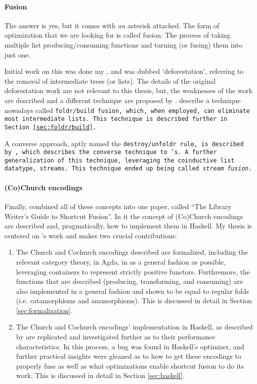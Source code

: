 \paragraph{Fusion}
The answer is yes{\Large*}, but it comes with \textit{an} asterisk attached.
The form of optimization that we are looking for is called fusion:
The process of taking multiple list producing/consuming functions and turning (or fusing) them into just one.

Initial work on this was done my \cite{Wadler1984,Wadler1986,Wadler1990}, and was dubbed `deforestation', referring to the removal of intermediate trees (or lists).
The details of the original deforestation work are not relevant to this thesis, but, the weaknesses of the work are described and a different technique are proposed by \cite{Gill1993}.
\cite{Gill1993} describe a technique nowadays called \tt{foldr/build} fusion, which, when employed, can eliminate most intermediate lists.
This technique is described further in Section \ref{sec:foldr/build}.

A converse approach, aptly named the \tt{destroy/unfoldr} rule, is described by \cite{Svenningsson2002}, which describes the converse technique to \cite{Gill1993}'s.
A further generalization of this technique, leveraging the coinductive list datatype, streams. This technique ended up being called \textit{stream fusion}.

\paragraph{(Co)Church encodings}
Finally, \cite{Harper2011} combined all of these concepts into one paper, called ``The Library Writer's Guide to Shortcut Fusion''. In it the concept of (Co)Church encodings are described and, pragmatically, how to implement them in Haskell.
My thesis is centered on \cite{Harper2011}'s work and makes two crucial contributions:
\begin{enumerate}
    \item The Church and Cochurch encodings described are formalized, including the relevant category theory, in Agda, in as a general fashion as possible, leveraging containers \citep{Abbott2005} to represent strictly positive functors.
    Furthremore, the functions that are described (producing, transforming, and consuming) are also implemented in a general fashion and shown to be equal to regular folds (i.e. catamorphisms and anamorphisms).
    This is discussed in detail in Section \ref{sec:formalization}.
    \item The Church and Cochurch encodings' implementation in Haskell, as described by \cite{Harper2011} are replicated and investigated further as to their performance characteristics.
    In this process, a bug was found in Haskell's optimizer, and further practical insights were gleaned as to how to get these encodings to properly fuse as well as what optimizations enable shortcut fusion to do its work.
    This is discussed in detail in Section \ref{sec:haskell}.
\end{enumerate}



